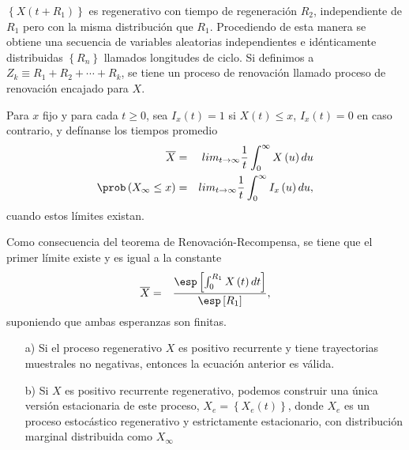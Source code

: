$\left\{X\left(t+R_{1}\right)\right\}$ es regenerativo con tiempo de regeneraci\'on $R_{2}$, independiente de $R_{1}$ pero con la misma distribuci\'on que $R_{1}$. Procediendo de esta manera se obtiene una secuencia de variables aleatorias independientes e id\'enticamente distribuidas $\left\{R_{n}\right\}$ llamados longitudes de ciclo. Si definimos a $Z_{k}\equiv R_{1}+R_{2}+\cdots+R_{k}$, se tiene un proceso de renovaci\'on llamado proceso de renovaci\'on encajado para $X$.




\begin{Def}
Para $x$ fijo y para cada $t\geq0$, sea $I_{x}\left(t\right)=1$ si $X\left(t\right)\leq x$,  $I_{x}\left(t\right)=0$ en caso contrario, y def\'inanse los tiempos promedio
\begin{eqnarray*}
\overline{X}&=&lim_{t\rightarrow\infty}\frac{1}{t}\int_{0}^{\infty}X\left(u\right)du\\
\prob\left(X_{\infty}\leq x\right)&=&lim_{t\rightarrow\infty}\frac{1}{t}\int_{0}^{\infty}I_{x}\left(u\right)du,
\end{eqnarray*}
cuando estos l\'imites existan.
\end{Def}

Como consecuencia del teorema de Renovaci\'on-Recompensa, se tiene que el primer l\'imite  existe y es igual a la constante
\begin{eqnarray*}
\overline{X}&=&\frac{\esp\left[\int_{0}^{R_{1}}X\left(t\right)dt\right]}{\esp\left[R_{1}\right]},
\end{eqnarray*}
suponiendo que ambas esperanzas son finitas.

\begin{Note}
\begin{itemize}
\item[a)] Si el proceso regenerativo $X$ es positivo recurrente y tiene trayectorias muestrales no negativas, entonces la ecuaci\'on anterior es v\'alida.
\item[b)] Si $X$ es positivo recurrente regenerativo, podemos construir una \'unica versi\'on estacionaria de este proceso, $X_{e}=\left\{X_{e}\left(t\right)\right\}$, donde $X_{e}$ es un proceso estoc\'astico regenerativo y estrictamente estacionario, con distribuci\'on marginal distribuida como $X_{\infty}$
\end{itemize}
\end{Note}



